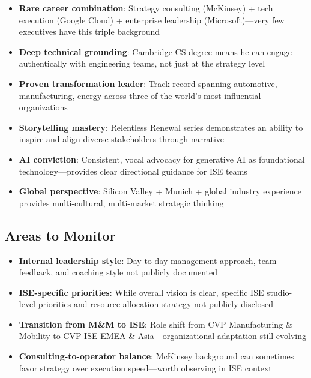 \documentclass[11pt,a4paper]{article}
\begin{document}
\begin{itemize}
    \item \textbf{Rare career combination}: Strategy consulting (McKinsey) + tech execution (Google Cloud) + enterprise leadership (Microsoft)---very few executives have this triple background
    \item \textbf{Deep technical grounding}: Cambridge CS degree means he can engage authentically with engineering teams, not just at the strategy level
    \item \textbf{Proven transformation leader}: Track record spanning automotive, manufacturing, energy across three of the world's most influential organizations
    \item \textbf{Storytelling mastery}: Relentless Renewal series demonstrates an ability to inspire and align diverse stakeholders through narrative
    \item \textbf{AI conviction}: Consistent, vocal advocacy for generative AI as foundational technology---provides clear directional guidance for ISE teams
    \item \textbf{Global perspective}: Silicon Valley + Munich + global industry experience provides multi-cultural, multi-market strategic thinking
\end{itemize}

\subsection{Areas to Monitor}

\begin{itemize}
    \item \textbf{Internal leadership style}: Day-to-day management approach, team feedback, and coaching style not publicly documented
    \item \textbf{ISE-specific priorities}: While overall vision is clear, specific ISE studio-level priorities and resource allocation strategy not publicly disclosed
    \item \textbf{Transition from M\&M to ISE}: Role shift from CVP Manufacturing \& Mobility to CVP ISE EMEA \& Asia---organizational adaptation still evolving
    \item \textbf{Consulting-to-operator balance}: McKinsey background can sometimes favor strategy over execution speed---worth observing in ISE context
\end{itemize}

\newpage

\end{document}
